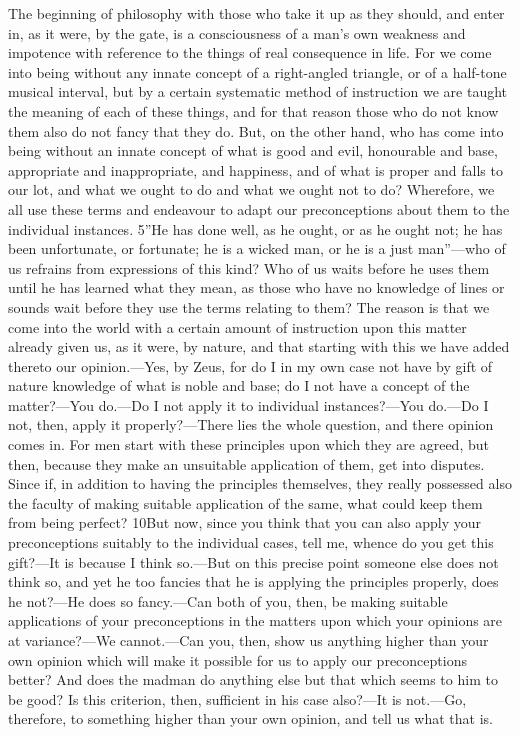 The beginning of philosophy with those who take it up as they should, and enter in, as it were, by the gate, is a consciousness of a man's own weakness and impotence with reference to the things of real consequence in life. For we come into being without any innate concept of a right-angled triangle, or of a half-tone musical interval, but by a certain systematic method of instruction we are taught the meaning of each of these things, and for that reason those who do not know them also do not fancy that they do. But, on the other hand, who has come into being without an innate concept of what is good and evil, honourable and base, appropriate and inappropriate, and happiness, and of what is proper and falls to our lot, and what we ought to do and what we ought not to do? Wherefore, we all use these terms and endeavour to adapt our preconceptions about them to the individual instances. 5''He has done well, as he ought, or as he ought not; he has been unfortunate, or fortunate; he is a wicked man, or he is a just man''—who of us refrains from expressions of this kind? Who of us waits before he uses them until he has learned what they mean, as those who have no knowledge of lines or sounds wait before they use the terms relating to them? The reason is that we come into the world with a certain amount of instruction upon this matter already given us, as it were, by nature, and that starting with this we have added thereto our opinion.—Yes, by Zeus, for do I in my own case not have by gift of nature knowledge of what is noble and base; do I not have a concept of the matter?—You do.—Do I not apply it to individual instances?—You do.—Do I not, then, apply it properly?—There lies the whole question, and there opinion comes in. For men start with these principles upon which they are agreed, but then, because they make an unsuitable application of them, get into disputes. Since if, in addition to having the principles themselves, they really possessed also the faculty of making suitable application of the same, what could keep them from being perfect? 10But now, since you think that you can also apply your preconceptions suitably to the individual cases, tell me, whence do you get this gift?—It is because I think so.—But on this precise point someone else does not think so, and yet he too fancies that he is applying the principles properly, does he not?—He does so fancy.—Can both of you, then, be making suitable applications of your preconceptions in the matters upon which your opinions are at variance?—We cannot.—Can you, then, show us anything higher than your own opinion which will make it possible for us to apply our preconceptions better? And does the madman do anything else but that which seems to him to be good? Is this criterion, then, sufficient in his case also?—It is not.—Go, therefore, to something higher than your own opinion, and tell us what that is.

